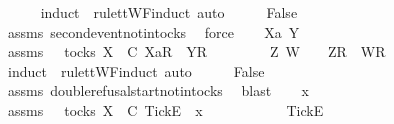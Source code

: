 \ \ \ \ \isamarkupfalse%
\ {\isacharparenleft}induct\ {\isasymrho}\ rule{\isacharcolon}ttWF{\isachardot}induct{\isacharcomma}\ auto{\isacharparenright}\isanewline
\ \ \isamarkupfalse%
\ \isamarkupfalse%
\ False\isanewline
\ \ \ \ \isamarkupfalse%
\ assms{\isacharparenleft}{}{\isacharparenright}\ second{\isacharunderscore}event{\isacharunderscore}notin{\isacharunderscore}tocks\ \isamarkupfalse%
\ force\isanewline
{}\isamarkupfalse%
\isanewline
\ \ \isamarkupfalse%
\ Xa\ Y\ {\isasymrho}\ {\isasymsigma}\isanewline
\ \ \isamarkupfalse%
\ assms{\isacharcolon}\ {\isachardoublequoteopen}{\isasymrho}\ {\isasymin}\ tocks\ X{\isachardoublequoteclose}\ {\isachardoublequoteopen}{\isasymrho}\ {\isasymsubseteq}\isactrlsub C\ {\isacharbrackleft}Xa{\isacharbrackright}\isactrlsub R\ {\isacharhash}\ {\isacharbrackleft}Y{\isacharbrackright}\isactrlsub R\ {\isacharhash}\ {\isasymsigma}{\isachardoublequoteclose}\isanewline
\ \ \isamarkupfalse%
\ \isamarkupfalse%
\ {\isasymrho}{\isacharprime}\ Z\ W\ \ {\isachardoublequoteopen}{\isasymrho}\ {\isacharequal}\ {\isacharbrackleft}Z{\isacharbrackright}\isactrlsub R\ {\isacharhash}\ {\isacharbrackleft}W{\isacharbrackright}\isactrlsub R\ {\isacharhash}\ {\isasymrho}{\isacharprime}{\isachardoublequoteclose}\isanewline
\ \ \ \ \isamarkupfalse%
\ {\isacharparenleft}induct\ {\isasymrho}\ rule{\isacharcolon}ttWF{\isachardot}induct{\isacharcomma}\ auto{\isacharparenright}\isanewline
\ \ \isamarkupfalse%
\ \isamarkupfalse%
\ False\isanewline
\ \ \ \ \isamarkupfalse%
\ assms{\isacharparenleft}{}{\isacharparenright}\ double{\isacharunderscore}refusal{\isacharunderscore}start{\isacharunderscore}notin{\isacharunderscore}tocks\ \isamarkupfalse%
\ blast\isanewline
{}\isamarkupfalse%
\isanewline
\ \ \isamarkupfalse%
\ x\ {\isasymrho}\ {\isasymsigma}\isanewline
\ \ \isamarkupfalse%
\ assms{\isacharcolon}\ {\isachardoublequoteopen}{\isasymrho}\ {\isasymin}\ tocks\ X{\isachardoublequoteclose}\ {\isachardoublequoteopen}{\isasymrho}\ {\isasymsubseteq}\isactrlsub C\ {\isacharbrackleft}Tick{\isacharbrackright}\isactrlsub E\ {\isacharhash}\ x\ {\isacharhash}\ {\isasymsigma}{\isachardoublequoteclose}\isanewline
\ \ \isamarkupfalse%
\ \isamarkupfalse%
\ {\isasymrho}{\isacharprime}\ \ {\isachardoublequoteopen}{\isasymrho}\ {\isacharequal}\ {\isacharbrackleft}Tick{\isacharbrackright}\isactrlsub E\ {\isacharhash}\ {\isasymrho}{\isacharprime}{\isachardoublequoteclose}\isanewline

